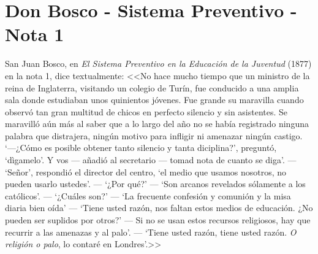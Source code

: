 \chapter{Don Bosco - Sistema Preventivo - Nota 1}
\label{ap:preventivo}
San Juan Bosco, en \emph{El Sistema Preventivo en la Educación de la Juventud} (1877) en la nota 1, dice textualmente: <<No hace mucho tiempo que un ministro de la reina de Inglaterra, visitando un colegio de Turín, fue conducido a una amplia sala donde estudiaban unos quinientos jóvenes. Fue grande su maravilla cuando observó tan gran multitud de chicos en perfecto silencio y sin asistentes. Se maravilló aún más al saber que a lo largo del año no se había registrado ninguna palabra que distrajera, ningún motivo para infligir ni amenazar ningún castigo. `---¿Cómo es posible obtener tanto silencio y tanta diciplina?', preguntó, `dìgamelo'. Y vos --- añadió al secretario --- tomad nota de cuanto se diga'. --- `Señor', respondió el director del centro, `el medio que usamos nosotros, no pueden usarlo ustedes'. --- `¿Por qué?' --- `Son arcanos revelados sólamente a los católicos'. --- `¿Cuáles son?' --- `La frecuente confesión y comunión y la misa diaria bien oída' --- `Tiene usted razón, nos faltan estos medios de educación. ¿No pueden ser suplidos por otros?' --- Si no se usan estos recursos religiosos, hay que recurrir a las amenazas y al palo'. --- `Tiene usted razón, tiene usted razón. \emph{O religión o palo}, lo contaré en Londres'.>> \citep{Canals95}